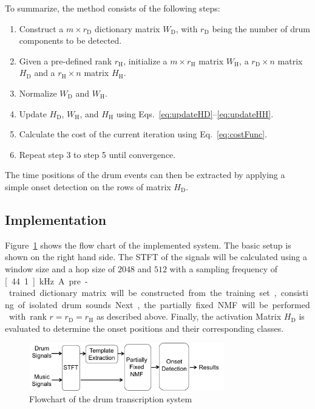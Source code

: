 \documentclass{article}
\newcommand{\figref}[1]{\mbox{Figure~\ref{#1}}}
\begin{document}
To summarize, the method consists of the following steps:
\begin{enumerate}
    \item   Construct a $m \times r_\mathrm{D}$ dictionary matrix $W_\mathrm{D}$, with $r_\mathrm{D}$ being the number of drum components to be detected.
    \item   Given a pre-defined rank $r_\mathrm{H}$, initialize a $m \times r_\mathrm{H}$ matrix $W_\mathrm{H}$, a $r_\mathrm{D} \times n$ matrix $H_\mathrm{D}$ and a $r_\mathrm{H} \times n$ matrix $H_\mathrm{H}$.
    \item   Normalize $W_\mathrm{D}$ and $W_\mathrm{H}$. 
    \item   Update $H_\mathrm{D}$, $W_\mathrm{H}$, and $H_\mathrm{H}$ using Eqs.~\eqref{eq:updateHD}--\eqref{eq:updateHH}.
    \item   Calculate the cost of the current iteration using Eq.~\eqref{eq:costFunc}.
    \item   Repeat step 3 to step 5 until convergence.
\end{enumerate}
The time positions of the drum events can then be extracted by applying a simple onset detection on the rows of matrix $H_\mathrm{D}$.

\subsection{Implementation}\label{subsec:processing steps}

\figref{fig:flowchart} shows the flow chart of the implemented system. The basic setup is shown on the right hand side. 
The STFT of the signals will be calculated using a window size and a hop size of $2048$ and $512$ with a sampling frequency of \unit[44.1]{kHz}. 
A pre-trained dictionary matrix will be constructed from the training set, consisting of isolated drum sounds. 
Next, the partially fixed NMF will be performed with rank $r = r_\mathrm{D} = r_\mathrm{H}$ as described above. 
Finally, the activation Matrix $H_\mathrm{D}$ is evaluated to determine the onset positions and their corresponding classes.  

\begin{figure}
 \centerline{%
 \includegraphics[width=8.5cm]{flowchart.png}}%
 \caption{Flowchart of the drum transcription system} %
 \label{fig:flowchart}
\end{figure}
\end{document}
